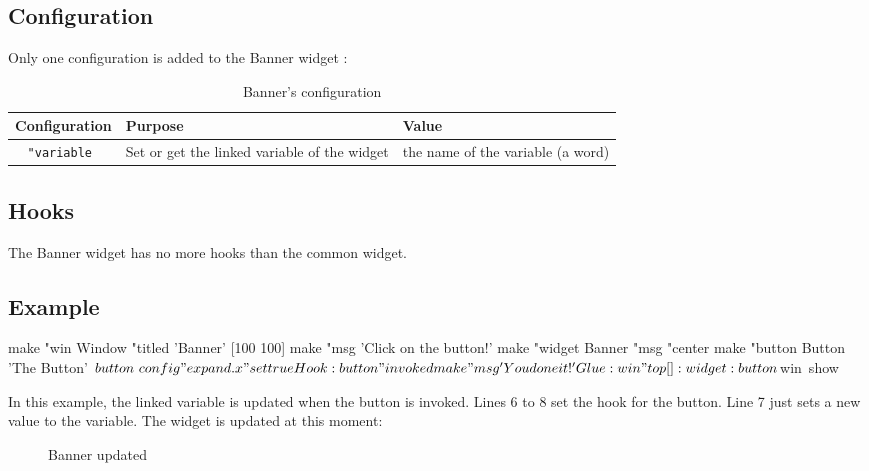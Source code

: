 \subsection{Configuration}

Only one configuration is added to the Banner widget :
\begin{table}[ht]
\centering
\begin{tabular}{|c|p{5cm}|p{5cm}|}
\hline
\bf Configuration & \bf Purpose & \bf Value \\
\hline
\tt "variable\index{Banner@\textbf{Banner}!Configuration!variable} & Set or get the linked variable of the widget & the name of the variable (a word)\\
\hline
\end{tabular}
\caption{Banner's configuration}
\end{table}
\subsection{Hooks}

The Banner widget has no more hooks than the common widget.

\subsection{Example}

\begin{listing}{1}
make "win Window "titled 'Banner' [100 100]
make "msg 'Click on the button!'
make "widget Banner "msg "center
make "button Button 'The Button'
$button~config "expand.x "set true
Hook :button "invoked {
	make "msg 'You done it!'	
}
Glue :win "top [] :widget :button
$win~show
\end{listing}

In this example, the linked variable is updated when the button is invoked. Lines 6 to 8 set the hook for the button.  Line 7 just sets a new value to the variable. The widget is updated at this moment:

\begin{figure}[ht!]
\centering
{}
\label{s22}
\caption{Banner updated}
\end{figure}
